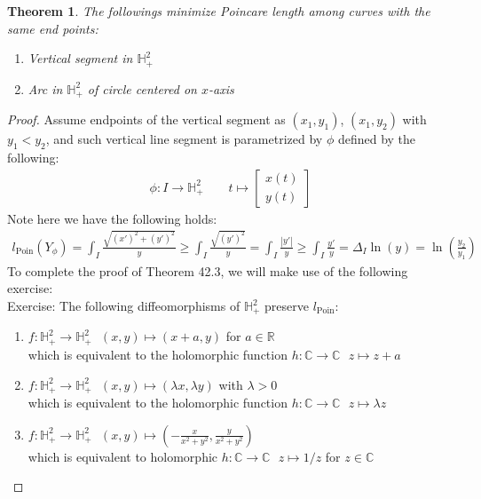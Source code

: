 \documentclass[15pt]{book}
\theoremstyle{break}
\theoremstyle{break}
\newtheorem{thm}{Theorem}[section]
\newcommand{\R}{\mathbb{R}}
\newcommand{\Complex}{\mathbb{C}}
\newcommand{\bmat}[1]{\begin{bmatrix} #1 \end{bmatrix}}
\newcommand{\exercise}{\color{green}Exercise: \color{black}}
\begin{document}
\begin{thm}
The followings minimize Poincare length among curves with the same end points:
\begin{enumerate}[topsep=3pt,itemsep=-1ex,partopsep=1ex,parsep=1ex]
\item Vertical segment in $\mathbb{H}_+^2$
\item Arc in $\mathbb{H}_+^2$ of circle centered on $x$-axis
\end{enumerate}
\end{thm}
\begin{proof}
Assume endpoints of the vertical segment as $(x_1, y_1)$, $(x_1,y_2)$ with $y_1 < y_2$, and such vertical line segment is parametrized by $\phi$ defined by the following:
\begin{align*}
\phi : I \to \mathbb{H}_+^2 \qquad t\mapsto \bmat{x(t) \\ y(t)}
\end{align*}
Note here we have the following holds:
\begin{align*}
l_{\text{Poin}}\left(Y_{\phi}\right) = \int_I \frac{\sqrt{(x')^2 + (y')^2}}{y} \geq \int_I \frac{\sqrt{(y')^2}}{y} =\int_I \frac{|y'|}{y} \geq \int_I \frac {y'}{y} = \Delta_I \ln(y) = \ln\left( \frac{y_2}{y_1}\right)
\end{align*}
To complete the proof of Theorem 42.3, we will make use of the following exercise:\\

\newpage
\exercise The following diffeomorphisms of $\mathbb{H}_+^2$ preserve $l_{\text{Poin}}$:
\begin{enumerate}[topsep=3pt,itemsep=-1ex,partopsep=1ex,parsep=1ex]
\item $f: \mathbb{H}_+^2 \to \mathbb{H}_+^2 \ \ \ (x,y) \mapsto (x+a, y)$ for $a \in \R$\\
which is equivalent to the holomorphic function $h:\Complex \to \Complex \ \ \ z\mapsto z+a$
\item $f: \mathbb{H}_+^2 \to \mathbb{H}_+^2\ \ \ (x,y) \mapsto (\lambda x, \lambda y)$ with $\lambda>0$\\
which is equivalent to the holomorphic function $h:\Complex \to \Complex \ \ \ z\mapsto \lambda z$
\item $f: \mathbb{H}_+^2 \to \mathbb{H}_+^2\ \ \ (x,y) \mapsto (-\frac{x}{x^2+y^2} , \frac{y}{x^2 + y^2})$\\
which is equivalent to holomorphic $h: \Complex  \to \Complex  \ \ \ z\mapsto 1/z$ for $z \in \Complex$
\end{enumerate}


\end{proof}
\end{document}
